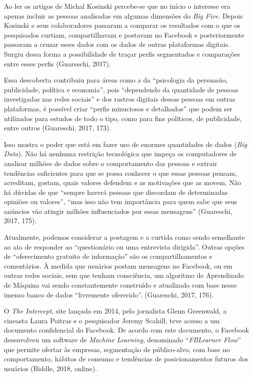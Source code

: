 Ao ler os artigos de Michal Kosinski percebe-se que no início o
interesse era apenas incluir as pessoas analisadas em algumas dimensões
do \emph{Big Five}. Depois Kosinski e seus colaboradores passaram a
comparar os resultados com o que os pesquisados curtiam, compartilhavam
e postavam no Facebook e posteriormente passaram a cruzar esses dados
com os dados de outras plataformas digitais. Surgiu dessa forma a
possibilidade de traçar perfis segmentados e comparações entre esses
perfis (Guareschi, 2017).

Essa descoberta contribuiu para áreas como a da ``psicologia da
persuasão, publicidade, política e economia'', pois ``dependendo da
quantidade de pessoas investigadas nas redes sociais'' e dos rastros
digitais dessas pessoas em outras plataformas, é possível criar ``perfis
minuciosos e detalhados'' que podem ser utilizados para estudos de todo
o tipo, como para fins políticos, de publicidade, entre outros
(Guareschi, 2017, 173).

Isso mostra o poder que está em fazer uso de enormes quantidades de
dados (\emph{Big Data}). Não há nenhuma restrição tecnológica que impeça
os computadores de analisar milhões de dados sobre o comportamento das
pessoas e extrair tendências suficientes para que se possa conhecer o
que essas pessoas pensam, acreditam, gostam, quais valores defendem e as
motivações que as movem. Não há dúvidas de que ``sempre haverá pessoas
que discordam de determinadas opiniões ou valores'', ``mas isso não tem
importância para quem sabe que seus anúncios vão atingir milhões
influenciados por essas mensagens'' (Guareschi, 2017, 175).

Atualmente, podemos considerar a postagem e a curtida como sendo
semelhante ao ato de responder ao ``questionário ou uma entrevista
dirigida''. Outras opções de ``oferecimento gratuito de informação'' são
os compartilhamentos e comentários. À medida que usuários postam
mensagens no Facebook, ou em outras redes sociais, sem que tenham
consciência, um algoritmo de Aprendizado de Máquina vai sendo
constantemente construído e atualizado com base nesse imenso banco de
dados ``livremente oferecido''. (Guareschi, 2017, 176).

O \emph{The Intercept}, site lançado em 2014, pelo jornalista Glenn
Greenwald, a cineasta Laura Poitras e o pesquisador Jeremy Scahill, teve
acesso a um documento confidencial do Facebook. De acordo com este
documento, o Facebook desenvolveu um software de \emph{Machine
Learning}, denominado ``\emph{FBLearner Flow}'' que permite ofertar às
empresas, segmentação de público-alvo, com base no comportamento,
hábitos de consumo e tendências de posicionamentos futuros dos usuários
(Biddle, 2018, online).

